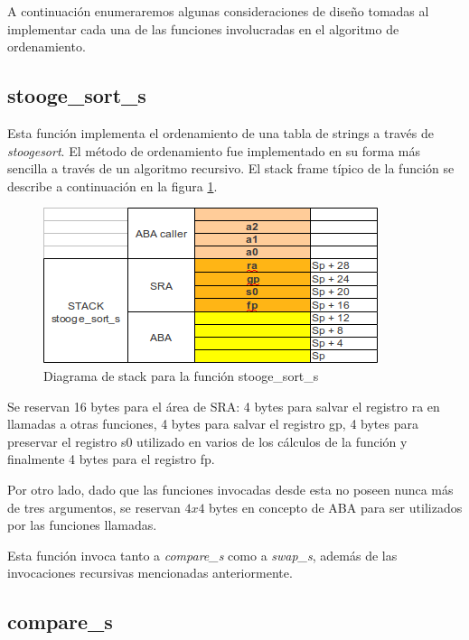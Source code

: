 \documentclass[a4paper,11pt]{article}
\begin{document}
A continuación enumeraremos algunas consideraciones de diseño tomadas al
implementar cada una de las funciones involucradas en el algoritmo de
ordenamiento.

\subsection{stooge\_sort\_s}

Esta función implementa el ordenamiento de una tabla de strings a través de
\textit{stoogesort}. El método de ordenamiento fue implementado en su forma más
sencilla a través de un algoritmo recursivo. El stack frame típico de la
función se describe a continuación en la figura \ref{fig:stackstooge}.

\begin{figure}[h!]
  \centering
  \includegraphics[width=\textwidth]{docs/stack_stooge_sort_s.png}
  \caption{Diagrama de stack para la función stooge\_sort\_s} \label{fig:stackstooge}
\end{figure}

\FloatBarrier

Se reservan 16 bytes para el área de SRA: 4 bytes para salvar el registro ra en
llamadas a otras funciones, 4 bytes para salvar el registro gp, 4 bytes para
preservar el registro s0 utilizado en varios de los cálculos de la función y
finalmente 4 bytes para el registro fp.

Por otro lado, dado que las funciones invocadas desde esta no poseen nunca más
de tres argumentos, se reservan \(4 x 4\) bytes en concepto de ABA para ser
utilizados por las funciones llamadas.

Esta función invoca tanto a \textit{compare\_s} como a \textit{swap\_s}, además
de las invocaciones recursivas mencionadas anteriormente.

\subsection{compare\_s}
\end{document}
